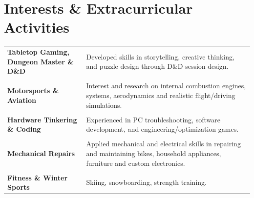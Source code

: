 \documentclass[
	11pt, %
]{resume} %
\begin{document}
\section*{Interests \& Extracurricular Activities}
\begin{longtable}{@{} p{3.5cm} p{11.5cm} @{}}

\textbf{Tabletop Gaming, \newline Dungeon Master \newline \& D\&D}   & Developed skills in storytelling, creative thinking, and puzzle design through D\&D session design.\\
\multicolumn{2}{c}{} \\ %

\textbf{Motorsports \newline \& Aviation}   & Interest and research on internal combustion engines, systems, aerodynamics and realistic flight/driving simulations. \\
\multicolumn{2}{c}{} \\ %

\textbf{Hardware \newline Tinkering \newline \& Coding} & Experienced in PC troubleshooting, software development, and engineering/optimization games. \\
\multicolumn{2}{c}{} \\ %

\textbf{Mechanical \newline Repairs}                 & Applied mechanical and electrical skills in repairing and maintaining bikes, household appliances, furniture and custom electronics.\\
\multicolumn{2}{c}{} \\ %

\textbf{Fitness \& \newline Winter Sports}  & Skiing, snowboarding, strength training.\\

\end{longtable}
\end{document}
